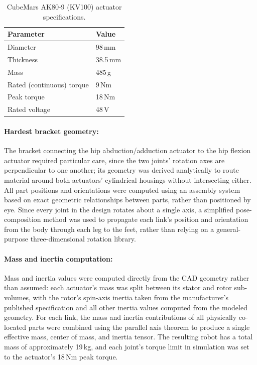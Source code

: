 \documentclass[12pt]{article}
\begin{document}
\begin{table}[htbp]
    \centering
    \caption{CubeMars AK80-9 (KV100) actuator specifications.}
    \label{tab:ak80_9_specs}
    \begin{tabular}{ll}
        \hline
        Parameter & Value \\
        \hline
        Diameter & 98\,mm \\
        Thickness & 38.5\,mm \\
        Mass & 485\,g \\
        Rated (continuous) torque & 9\,Nm \\
        Peak torque & 18\,Nm \\
        Rated voltage & 48\,V \\
        \hline
    \end{tabular}
\end{table}

\paragraph{Hardest bracket geometry:} The bracket connecting the hip abduction/adduction actuator to the hip flexion actuator required particular care, since the two joints' rotation axes are perpendicular to one another; its geometry was derived analytically to route material around both actuators' cylindrical housings without intersecting either. All part positions and orientations were computed using an assembly system based on exact geometric relationships between parts, rather than positioned by eye. Since every joint in the design rotates about a single axis, a simplified pose-composition method was used to propagate each link's position and orientation from the body through each leg to the feet, rather than relying on a general-purpose three-dimensional rotation library.
\paragraph{Mass and inertia computation:} Mass and inertia values were computed directly from the CAD geometry rather than assumed: each actuator's mass was split between its stator and rotor sub-volumes, with the rotor's spin-axis inertia taken from the manufacturer's published specification and all other inertia values computed from the modeled geometry. For each link, the mass and inertia contributions of all physically co-located parts were combined using the parallel axis theorem to produce a single effective mass, center of mass, and inertia tensor. The resulting robot has a total mass of approximately 19\,kg, and each joint's torque limit in simulation was set to the actuator's 18\,Nm peak torque.
\end{document}

